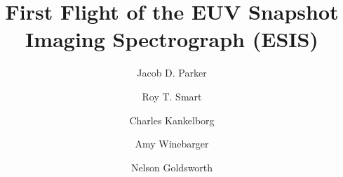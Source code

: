 \documentclass[linenumbers,trackchanges]{aastex63}
\begin{document}
	\newcommand{\defaultChannel}{1}
\newcommand{\dateMission}{September 30, 2019}
\newcommand{\timeMissionStart}{18:04:00}
\newcommand{\timeShutterOpen}{18:05:13}
\newcommand{\timeMissionShutterOpen}{73.0 s}
\newcommand{\timeShutterClose}{18:11:13}
\newcommand{\timeMissionShutterClose}{433.0 s}
\newcommand{\timeRlgEnable}{18:06:04}
\newcommand{\timeMissionRlgEnable}{124.2 s}
\newcommand{\timeRlgDisable}{18:11:11}
\newcommand{\timeParachuteDeploy}{18:13:29}
\newcommand{\timeDataStart}{18:04:00}
\newcommand{\timeDataStop}{18:15:41}
\newcommand{\timeLightStart}{18:06:11}
\newcommand{\timeLightStop}{18:11:01}
\newcommand{\timeApogee}{18:08:20}
\newcommand{\timeApogeeFrame}{18:08:17}
\newcommand{\numDataFrames}{29}
\newcommand{\numDarkFrames}{20}
\newcommand{\imageShape}{(1040, 2048)}
\newcommand{\fov}{11.5 $\mathrm{{}^{\prime}}$}
\newcommand{\gain}{2.56$\pm$0.03 $\mathrm{e^{-}\,DN^{-1}}$}
\newcommand{\readoutNoise}{4.02$\pm$0.14 $\mathrm{DN}$}
\newcommand{\plateScale}{[0.74, 0.77] $\mathrm{{}^{\prime\prime}\,pix^{-1}}$}
\newcommand{\dispersion}{0.037 $\mathrm{\mathring{A}\,pix^{-1}}$}
 	\renewcommand\arcmin{\mbox{$^\prime$}}
\renewcommand\arcsec{\mbox{$^{\prime\prime}$}}

\newcommand{\rts}[1]{{\color{violet} RTS: #1}} \newcommand{\jdp}[1]{{\color{red} JDP: #1}} \newcommand{\cck}[1]{{\color{brown} CCK: #1}} \newcommand{\amy}[1]{{\color{cyan} ARW: #1}}

\newcommand{\spectralline}[3]{#1\,{\textsc{#2}}\ #3\,\AA } 
\newcommand{\ov}{\spectralline{O}{v}{629.7}}
\newcommand{\oiii}{\spectralline{O}{iii}{599.6}}
\newcommand{\oiv}{\spectralline{O}{iv}{608.4}}
\newcommand{\oivTwo}{\spectralline{O}{iv}{609.83}}
\newcommand{\mgxbright}{\spectralline{Mg}{x}{609.79}}
\newcommand{\mgxdim}{\spectralline{Mg}{x}{624.9}}
\newcommand{\hei}{\spectralline{He}{i}{584.3}}
\newcommand{\heii}{\spectralline{He}{ii}{304}}
\newcommand{\siiv}{\spectralline{Si}{iv}{1394}}

\newcommand{\esispointing}{[18\arcsec, -19\arcsec]}
\newcommand{\esisroll}{\ensuremath{0.85^{\circ}}}
\newcommand{\esisfov}{11.5\arcmin}
\newcommand{\aianearapogee}{18:08:17\,UTC} 	\title{First Flight of the EUV Snapshot Imaging Spectrograph (ESIS)}
	
	\author[0000-0001-8732-8284]{Jacob D. Parker}
	\author[0000-0002-9997-5515]{Roy T. Smart}
	\author[0000-0002-1992-7469]{Charles Kankelborg}
	\author[0000-0002-5608-531X]{Amy Winebarger}
	\author[0000-0002-6787-0380]{Nelson Goldsworth}
	
\end{document}
